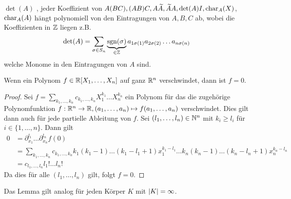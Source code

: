 \begin{remark}
	$\det(A)$ , jeder Koeffizient von $A(BC), (AB)C, A  \widetilde{A}, \widetilde{A} A, \det(A) I, \operatorname{char}_{A}(X)$, $ \operatorname{char}_{A}(A)$ 
	hängt polynomiell von den Eintragungen von $A,B,C$ ab, wobei die Koeffizienten in $\mathbb{Z}$ liegen z.B.
	\[
		\det(A) = \sum_{\sigma \in S_{n}} \underbrace{\operatorname{sgn}(\sigma)}_{\in \mathbb{Z}}
			a_{1 \sigma(1)} a_{2 \sigma(2)} \ldots a_{n \sigma(n)}
		\]
		welche Monome in den Eintragungen von $A$ sind.
\end{remark}

\begin{lemma}
	Wenn ein Polynom $f \in \mathbb{R}[X_1,\ldots,X_{n}]$ auf ganz $\mathbb{R}^{n}$ verschwindet, dann ist $f=0$.
\end{lemma}

\begin{proof}
	Sei $f= \sum_{k_1,\ldots,k_{n}} c_{k_1,\ldots,k_{n}} X_1^{k_1} \ldots X_{n}^{k_{n}}$ ein Polynom für das die zugehörige Polynomfunktion
	$f: \mathbb{R}^{n} \to \mathbb{R}, (a_1,\ldots,a_{n}) \mapsto f(a_1,\ldots,a_{n})$ verschwindet.
	Dies gilt dann auch für jede partielle Ableitung von $f$.
	Sei $(l_1,\ldots,l_{n}) \in \mathbb{N}^{n}$ mit $k_{i} \geq l_{i}$ für $i \in \{1,\ldots,n\} $. Dann gilt
	\begin{align*}
		0 &= \partial_{x_1}^{l_1} \ldots \partial_{x_{n}}^{l_{n}} f(0)\\
		&= \sum_{k_1,\ldots,k_{n}} c_{k_1,\ldots,k_{n}} k_1 (k_1-1) \ldots (k_1-l_1 +1) x_1^{k_1-l_1} \ldots 
		k_{n} (k_{n} -1) \ldots (k_{n} - l_{n} +1) x_{n}^{k_{n} - l_{n}}\\
		&= c_{l_1,\ldots, l_{n}} l_1! \ldots l_{n}!
	\end{align*}
	Da dies für alle $(l_1,\ldots,l_{n})$ gilt, folgt $f=0$.
\end{proof}

\begin{remark}
	Das Lemma gilt analog für jeden Körper $K$ mit $\abs{K} = \infty$.
\end{remark}

